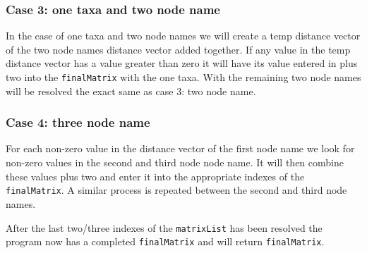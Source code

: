 \documentclass{article}
\begin{document}
\subsubsection{Case 3: one taxa and two node name}

In the case of one taxa and two node names we will create a temp distance vector of the two node names distance vector added together. If any value in the temp distance vector has a value greater than zero it will have its value entered in plus two into the {\tt finalMatrix} with the one taxa. With the remaining two node names will be resolved the exact same as case 3: two node name.

\subsubsection{Case 4: three node name}

For each non-zero value in the distance vector of the first node name we look for non-zero values in the second and third node node name. It will then combine these values plus two and enter it into the appropriate indexes of the {\tt finalMatrix}. A similar process is repeated between the second and third node names. 

After the last two/three indexes of the {\tt matrixList} has been resolved the program now has a completed {\tt finalMatrix} and will return {\tt finalMatrix}.
\end{document}

